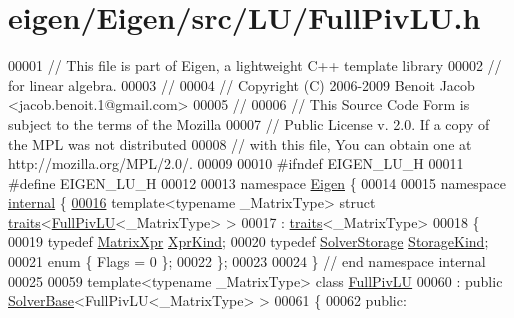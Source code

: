 \hypertarget{eigen_2_eigen_2src_2_l_u_2_full_piv_l_u_8h_source}{}\section{eigen/\+Eigen/src/\+L\+U/\+Full\+Piv\+LU.h}
\label{eigen_2_eigen_2src_2_l_u_2_full_piv_l_u_8h_source}

\begin{DoxyCode}
00001 \textcolor{comment}{// This file is part of Eigen, a lightweight C++ template library}
00002 \textcolor{comment}{// for linear algebra.}
00003 \textcolor{comment}{//}
00004 \textcolor{comment}{// Copyright (C) 2006-2009 Benoit Jacob <jacob.benoit.1@gmail.com>}
00005 \textcolor{comment}{//}
00006 \textcolor{comment}{// This Source Code Form is subject to the terms of the Mozilla}
00007 \textcolor{comment}{// Public License v. 2.0. If a copy of the MPL was not distributed}
00008 \textcolor{comment}{// with this file, You can obtain one at http://mozilla.org/MPL/2.0/.}
00009 
00010 \textcolor{preprocessor}{#ifndef EIGEN\_LU\_H}
00011 \textcolor{preprocessor}{#define EIGEN\_LU\_H}
00012 
00013 \textcolor{keyword}{namespace }\hyperlink{namespace_eigen}{Eigen} \{
00014 
00015 \textcolor{keyword}{namespace }\hyperlink{namespaceinternal}{internal} \{
\hyperlink{struct_eigen_1_1internal_1_1traits_3_01_full_piv_l_u_3_01___matrix_type_01_4_01_4}{00016} \textcolor{keyword}{template}<\textcolor{keyword}{typename} \_MatrixType> \textcolor{keyword}{struct }\hyperlink{struct_eigen_1_1internal_1_1traits}{traits}<\hyperlink{group___l_u___module_class_eigen_1_1_full_piv_l_u}{FullPivLU}<\_MatrixType> >
00017  : \hyperlink{struct_eigen_1_1internal_1_1traits}{traits}<\_MatrixType>
00018 \{
00019   \textcolor{keyword}{typedef} \hyperlink{struct_eigen_1_1_matrix_xpr}{MatrixXpr} \hyperlink{struct_eigen_1_1_matrix_xpr}{XprKind};
00020   \textcolor{keyword}{typedef} \hyperlink{struct_eigen_1_1_solver_storage}{SolverStorage} \hyperlink{struct_eigen_1_1_solver_storage}{StorageKind};
00021   \textcolor{keyword}{enum} \{ Flags = 0 \};
00022 \};
00023 
00024 \} \textcolor{comment}{// end namespace internal}
00025 
00059 \textcolor{keyword}{template}<\textcolor{keyword}{typename} \_MatrixType> \textcolor{keyword}{class }\hyperlink{group___l_u___module_class_eigen_1_1_full_piv_l_u}{FullPivLU}
00060   : \textcolor{keyword}{public} \hyperlink{class_eigen_1_1_solver_base}{SolverBase}<FullPivLU<\_MatrixType> >
00061 \{
00062   \textcolor{keyword}{public}:

\end{DoxyCode}
